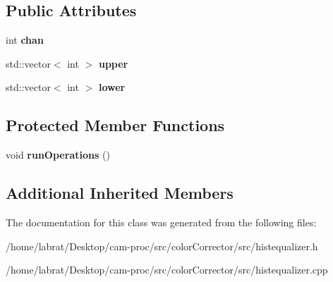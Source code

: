 \subsection*{Public Attributes}
\begin{DoxyCompactItemize}
\item 
int {\bfseries chan}\hypertarget{classHistEqualizer_a734bad8d5c068aa61c4be3234059c4fb}{}\label{classHistEqualizer_a734bad8d5c068aa61c4be3234059c4fb}

\item 
std\+::vector$<$ int $>$ {\bfseries upper}\hypertarget{classHistEqualizer_a278935336e7f82453ce167c9c678e183}{}\label{classHistEqualizer_a278935336e7f82453ce167c9c678e183}

\item 
std\+::vector$<$ int $>$ {\bfseries lower}\hypertarget{classHistEqualizer_a5a2d6be17250463714a57d47775b2379}{}\label{classHistEqualizer_a5a2d6be17250463714a57d47775b2379}

\end{DoxyCompactItemize}
\subsection*{Protected Member Functions}
\begin{DoxyCompactItemize}
\item 
void {\bfseries run\+Operations} ()\hypertarget{classHistEqualizer_a9364b0f5e615b7623a029400b710c06a}{}\label{classHistEqualizer_a9364b0f5e615b7623a029400b710c06a}

\end{DoxyCompactItemize}
\subsection*{Additional Inherited Members}


The documentation for this class was generated from the following files\+:\begin{DoxyCompactItemize}
\item 
/home/labrat/\+Desktop/cam-\/proc/src/color\+Corrector/src/histequalizer.\+h\item 
/home/labrat/\+Desktop/cam-\/proc/src/color\+Corrector/src/histequalizer.\+cpp\end{DoxyCompactItemize}
